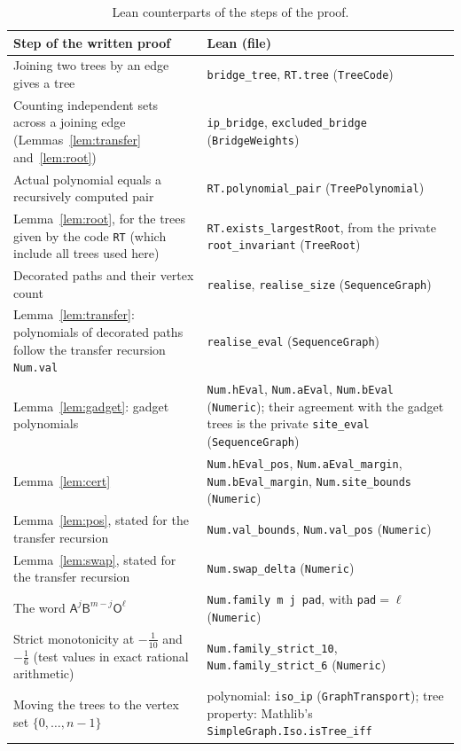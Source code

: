 \documentclass[11pt]{article}
\theoremstyle{definition}
\theoremstyle{remark}
\newcommand{\sA}{\mathsf A}
\newcommand{\sB}{\mathsf B}
\newcommand{\sO}{\mathsf O}
\begin{document}
{\begin{table}[ht]
\centering\footnotesize
\renewcommand{\arraystretch}{1.05}
\begin{tabular}{@{}>{\raggedright\arraybackslash}p{}>{\raggedright\arraybackslash}p{}@{}}
\hline
Step of the written proof & Lean (file) \\
\hline
Joining two trees by an edge gives a tree &
\texttt{bridge\_tree}, \texttt{RT.tree} (\texttt{TreeCode}) \\
Counting independent sets across a joining edge
(Lemmas~\ref{lem:transfer} and~\ref{lem:root}) &
\texttt{ip\_bridge}, \texttt{excluded\_bridge} (\texttt{BridgeWeights}) \\
Actual polynomial equals a recursively computed pair &
\texttt{RT.polynomial\_pair} (\texttt{TreePolynomial}) \\
Lemma~\ref{lem:root}, for the trees given by the code \texttt{RT} (which
include all trees used here) &
\texttt{RT.exists\_largestRoot}, from the private \texttt{root\_invariant}
(\texttt{TreeRoot}) \\
Decorated paths and their vertex count &
\texttt{realise}, \texttt{realise\_size} (\texttt{SequenceGraph}) \\
Lemma~\ref{lem:transfer}: polynomials of decorated paths follow the transfer
recursion \texttt{Num.val} &
\texttt{realise\_eval} (\texttt{SequenceGraph}) \\
Lemma~\ref{lem:gadget}: gadget polynomials &
\texttt{Num.hEval}, \texttt{Num.aEval}, \texttt{Num.bEval} (\texttt{Numeric});
their agreement with the gadget trees is the private \texttt{site\_eval}
(\texttt{SequenceGraph}) \\
Lemma~\ref{lem:cert} &
\texttt{Num.hEval\_pos}, \texttt{Num.aEval\_margin}, \texttt{Num.bEval\_margin},
\texttt{Num.site\_bounds} (\texttt{Numeric}) \\
Lemma~\ref{lem:pos}, stated for the transfer recursion &
\texttt{Num.val\_bounds}, \texttt{Num.val\_pos} (\texttt{Numeric}) \\
Lemma~\ref{lem:swap}, stated for the transfer recursion &
\texttt{Num.swap\_delta} (\texttt{Numeric}) \\
The word $\sA^j\sB^{m-j}\sO^\ell$ &
\texttt{Num.family m j pad}, with \texttt{pad}${}=\ell$ (\texttt{Numeric}) \\
Strict monotonicity at $-\frac1{10}$ and $-\frac16$ (test values in exact
rational arithmetic) &
\texttt{Num.family\_strict\_10}, \texttt{Num.family\_strict\_6}
(\texttt{Numeric}) \\
Moving the trees to the vertex set $\{0,\dots,n-1\}$ &
polynomial: \texttt{iso\_ip} (\texttt{GraphTransport}); tree property:
Mathlib's \texttt{SimpleGraph.Iso.isTree\_iff} \\
\hline
\end{tabular}
\caption{Lean counterparts of the steps of the proof.}
\label{tab:lean}
\end{table}

}
\end{document}
